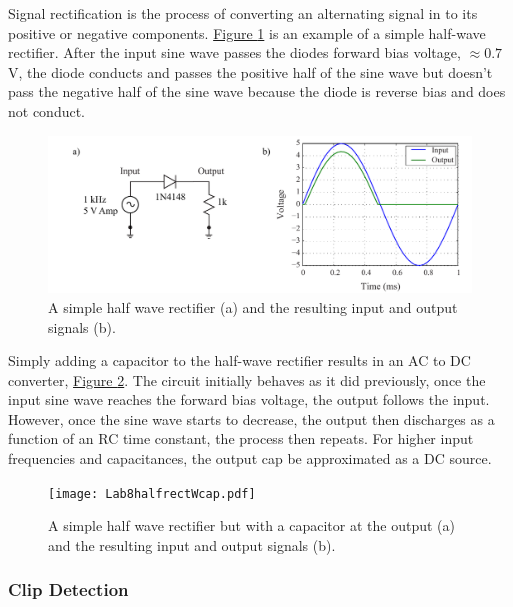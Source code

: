 Signal rectification is the process of converting an alternating signal in to its positive or negative components. \hyperref[fig:rect]{Figure \ref*{fig:rect}} is an example of a simple half-wave rectifier. After the input sine wave passes the diodes forward bias voltage, $\approx 0.7$ V, the diode conducts and passes the positive half of the sine wave but doesn't pass the negative half of the sine wave because the diode is reverse bias and does not conduct.

\begin{figure} [h!]
	\centering
		\includegraphics[width=1\textwidth]{Lab6halfrect.pdf}
	\caption{A simple half wave rectifier (a) and the resulting input and output signals (b). } \label{fig:rect}
\end{figure}

Simply adding a capacitor to the half-wave rectifier results in an AC to DC converter, \hyperref[fig:rectWcap]{Figure \ref*{fig:rectWcap}}. The circuit initially behaves as it did previously, once the input sine wave reaches the forward bias voltage, the output follows the input. However, once the sine wave starts to decrease, the output then discharges as a function of an RC time constant, the process then repeats. For higher input frequencies and capacitances, the output cap be approximated as a DC source. 

\begin{figure} [h!]
	\centering
		\texttt{[image: Lab8halfrectWcap.pdf]}
	\caption{A simple half wave rectifier but with a capacitor at the output (a) and the resulting input and output signals (b).} \label{fig:rectWcap}
\end{figure}


\subsubsection{Clip Detection}

